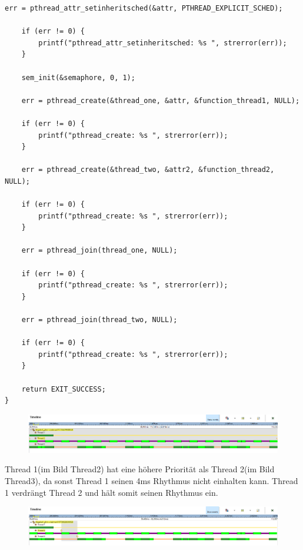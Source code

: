 \documentclass[12pt,a4paper,bibliography=totocnumbered]{scrartcl}
\begin{document}
\begin{lstlisting}[style=CStyle]
	err = pthread_attr_setinheritsched(&attr, PTHREAD_EXPLICIT_SCHED);

	if (err != 0) {
		printf("pthread_attr_setinheritsched: %s ", strerror(err));
	}

	sem_init(&semaphore, 0, 1);

	err = pthread_create(&thread_one, &attr, &function_thread1, NULL);

	if (err != 0) {
		printf("pthread_create: %s ", strerror(err));
	}

	err = pthread_create(&thread_two, &attr2, &function_thread2, NULL);

	if (err != 0) {
		printf("pthread_create: %s ", strerror(err));
	}

	err = pthread_join(thread_one, NULL);

	if (err != 0) {
		printf("pthread_create: %s ", strerror(err));
	}

	err = pthread_join(thread_two, NULL);

	if (err != 0) {
		printf("pthread_create: %s ", strerror(err));
	}

	return EXIT_SUCCESS;
}
\end{lstlisting}

\begin{figure}[h]
\includegraphics[width=\textwidth]{bilder/QNX_A4}
\centering
\end{figure}
Thread 1(im Bild Thread2) hat eine höhere Priorität als Thread 2(im Bild Thread3), da sonst Thread 1 seinen 4ms Rhythmus nicht einhalten kann. Thread 1 verdrängt Thread 2 und hält somit seinen Rhythmus ein.

\begin{figure}[h]
\includegraphics[width=\textwidth]{bilder/QNX_A4_1}
\centering
\end{figure}
\end{document}
